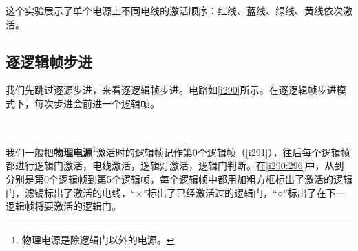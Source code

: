 这个实验展示了单个电源上不同电线的激活顺序：红线、蓝线、绿线、黄线依次激活。

\subsection{逐逻辑帧步进}
我们先跳过逐源步进，来看逐逻辑帧步进。电路如\autoref{i290}所示。在逐逻辑帧步进模式下，每次步进会前进一个逻辑帧。
\begin{figure}
\begin{center}
\\
\qquad
{}
\qquad
{}
\qquad
{}
\qquad
{}
\qquad
{}
\end{center}
\caption{}\label{i290:296}
\end{figure}

我们一般把\textbf{物理电源}\footnote{物理电源是除逻辑门以外的电源。}激活时的逻辑帧记作第0个逻辑帧（\autoref{i291}），往后每个逻辑帧都进行逻辑门激活，电线激活，逻辑灯激活，逻辑门判断。在\autoref{i290:296}中，从到分别是第0个逻辑帧到第5个逻辑帧，每个逻辑帧中都用加粗方框标出了激活的逻辑门，滤镜标出了激活的电线，“×”标出了已经激活过的逻辑门，“○”标出了在下一逻辑帧将要激活的逻辑门。


